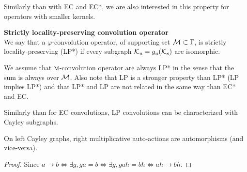 Similarly than with EC and EC*, we are also interested in this property for operators with smaller kernels.

\begin{definition}\textbf{Strictly locality-preserving convolution operator}\\
We say that a $\varphi$-convolution operator, of supporting set $\mathcal{M} \subset \Gamma$, is strictly locality-preserving (LP*) if every subgraph  $\mathcal{K}_u = g_u(\mathcal{K}_e)$ are isomorphic.
\label{def:lpp}
\end{definition}

\begin{remark}
We assume that $\operatorname{\textsc{m}}$-convolution operator are always LP* in the sense that the sum is always over $\mathcal{M}$. Also note that LP is a stronger property than LP* (\ie LP implies LP*) and that LP* and LP are not related in the same way than EC* and EC.
\end{remark}

Similarly than for EC convolutions, LP convolutions can be characterized with Cayley subgraphs.

\begin{lemma}
On left Cayley graphs, right multiplicative auto-actions are automorphisms (and vice-versa).
\label{lem:lat}
\end{lemma}
\begin{proof}
Since $a \rightarrow b \Leftrightarrow \exists g, ga = b \Leftrightarrow \exists g, gah = bh \Leftrightarrow ah \rightarrow bh$.
\end{proof}

